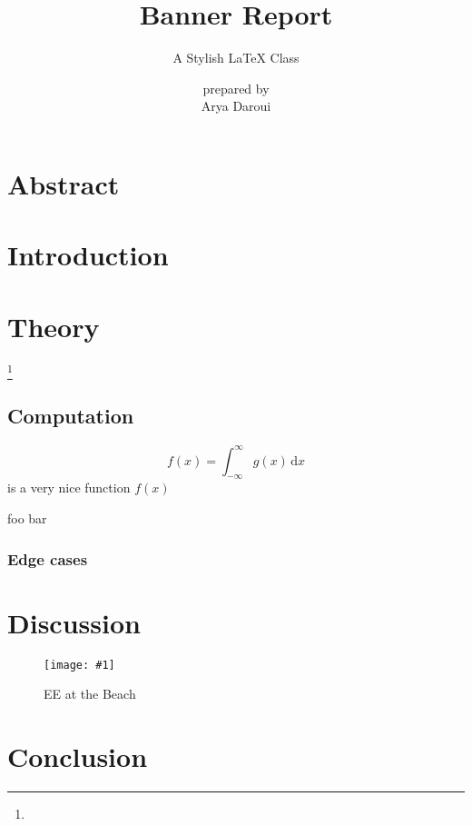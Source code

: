 \documentclass{bannerReport}
\title{Banner Report}
\subtitle{A Stylish \LaTeX \hspace{.008em} Class}
\author{ {\small prepared by} \\ Arya Daroui}
\newcommand{\fig}[2]{
	\begin{figure}[ht]
		\centering
		\texttt{[image: \#1]}
		\caption{#2}
	\end{figure}
}
\begin{document}

	\section*{Abstract}
		\lipsum[1]

	\section{Introduction}
		\lipsum[2]

	\section{Theory}
		\lipsum[3] \footnote{\lipsum[10][1]}
		\subsection{Computation}
			\lipsum[4]
			
			\begin{dent}
				\lipsum[2]
				$$
					f(x) = \int_{-\infty}^\infty g(x) \, \mathrm{d}x
				$$
				is a very nice function $f(x)$
			\end{dent}

			\begin{code}
foo
bar
			\end{code}
			
			\subsubsection{Edge cases}
				\lipsum[5]

	\section{Discussion}
		\lipsum[6]
		\fig{EE.png}{EE at the Beach}
		

	\section{Conclusion}
		\lipsum[7]
\end{document}
